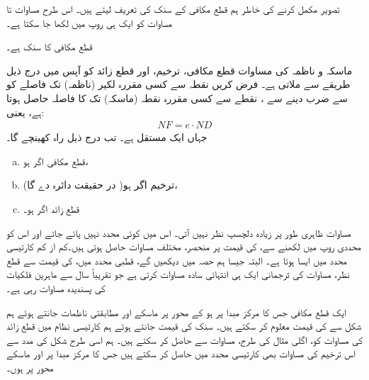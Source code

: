 تصویر مکمل کرنے کی خاطر ہم قطع مکافی کے  سنک کی تعریف  لیتے ہیں۔ اس طرح  مساوات  تا مساوات  کو  ایک ہی روپ  میں لکھا جا سکتا ہے۔

قطع مکافی کا سنک  ہے۔

ماسکہ و  ناظمہ کی مساوات  قطع مکافی، ترخیم،  اور قطع زائد کو آپس میں  درج ذیل طریقے سے ملاتی ہے۔ فرض کریں نقطہ  سے کسی مقررہ لکیر (ناظمہ) تک فاصلے کو     سے ضرب دینے سے  ، نقطے  سے کسی مقررہ نقطہ  (ماسکہ) تک کا  فاصلہ  حاصل ہوتا ہے، یعنی:
\begin{align}\label{مساوات_مخروط_سنکی_تعلق} 
NF=e\cdot ND
\end{align}
جہاں  ایک مستقل ہے۔ تب  درج ذیل راہ کھینچے گا۔
\begin{enumerate}[a.]
\item
قطع مکافی اگر  ہو،
\item
ترخیم اگر  ہو( در حقیقت دائرہ  دے گا)، 
\item
قطع زائد اگر  ہو۔
\end{enumerate} 

مساوات  ظاہری طور پر زیادہ دلچسپ نظر نہیں آتی۔ اس میں کوئی محدد نہیں پائے جاتے  اور اس کو  محددی روپ میں لکھنے سے،  کی قیمت پر منحصر، مختلف مساوات حاصل ہوتی  ہیں۔کم از کم کارتیسی محدد میں ایسا ہوتا ہے۔ البتہ جیسا ہم حصہ  میں دیکھیں گے، قطبی محدد میں،  کی قیمت سے قطع نظر، مساوات  کی ترجمانی ایک ہی انتہائی سادہ مساوات کرتی ہے جو تقریباً  سال سے ماہرین فلکیات   کی پسندیدہ مساوات رہی ہے۔

ایک قطع مکافی جس کا مرکز مبدا پر ہو  کے  محور  پر ماسکے  اور مطابقتی ناظمات جانتے ہوئے ہم  شکل   سے  کی قیمت معلوم کر سکتے ہیں۔ سنک  کی قیمت جانتے ہوئے ہم کارتیسی نظام میں  قطع زائد کی مساوات کو، اگلی مثال کی طرح، مساوات  سے  حاصل کر سکتے ہیں۔ ہم اسی طرح شکل  کی مدد سے  اس ترخیم کی مساوات بھی کارتیسی محدد میں حاصل کر سکتے ہیں جس کا مرکز مبدا پر اور ماسکے محور  پر ہوں۔

